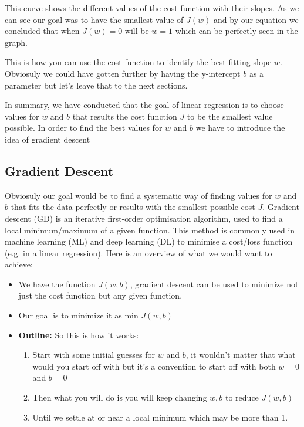 This curve shows the different values of the cost function with their slopes.
As we can see our goal was to have the smallest value of $J(w)$ and by our equation we concluded that when $J(w)=0$ will be $w=1$ which can be perfectly seen in the graph.

This is how you can use the cost function to identify the best fitting slope $w$.
Obviosuly we could have gotten further by having the y-intercept $b$ as a parameter but let's leave that to the next sections.

In summary, we have conducted that the goal of linear regression is to choose values for $w$ and $b$ that results the cost function $J$ to be the smallest value possible.
In order to find the best values for $w$ and $b$ we have to introduce the idea of gradient descent

\subsection{Gradient Descent}
Obviosuly our goal would be to find a systematic way of finding values for $w$ and $b$ that fits the data perfectly or results with the smallest possible cost $J$.
Gradient descent (GD) is an iterative first-order optimisation algorithm, used to find a local minimum/maximum of a given function. This method is commonly used in machine learning (ML) and deep learning (DL) to minimise a cost/loss function (e.g. in a linear regression).
Here is an overview of what we would want to achieve:
\begin{itemize}
  \item We have the function $J(w,b)$, gradient descent can be used to minimize not just the cost function but any given function.
  \item Our goal is to minimize it as min $J(w,b)$
  \item \textbf{Outline: } So this is how it works:
        \begin{enumerate}
          \item Start with some initial guesses for $w$ and $b$, it wouldn't matter that what would you start off with but it's a convention to start off with both $w=0$ and $b=0$
          \item Then what you will do is you will keep changing $w,b$ to reduce $J(w,b)$
          \item Until we settle at or near a local minimum which may be more than 1.
        \end{enumerate}
\end{itemize}

